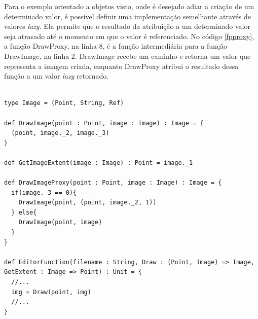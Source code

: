 Para o exemplo orientado a objetos visto, 
onde é desejado adiar a criação de um 
determinado valor, é possível definir 
uma implementação semelhante através 
de valores \textit{lazy}. Ela permite que 
o resultado da atribuição a um determinado 
valor seja atrasado até o momento em que 
o valor é referenciado\cite{functionalscala}. 
No código \ref{fpproxy}, a função DrawProxy, 
na linha 8, é a função intermediária para a 
função DrawImage, na linha 2. DrawImage recebe 
um caminho e retorna um valor que representa 
a imagem criada, enquanto DrawProxy atribui 
o resultado dessa função a um valor \textit{lazy} 
retornado.

\begin{lstlisting}[caption={Proxy Funcional},label=fpproxy]
    
type Image = (Point, String, Ref)

def DrawImage(point : Point, image : Image) : Image = {
  (point, image._2, image._3)
}

def GetImageExtent(image : Image) : Point = image._1

def DrawImageProxy(point : Point, image : Image) : Image = {
  if(image._3 == 0){
    DrawImage(point, (point, image._2, 1))
  } else{
    DrawImage(point, image)
  }
}

def EditorFunction(filename : String, Draw : (Point, Image) => Image, GetExtent : Image => Point) : Unit = {
  //...
  img = Draw(point, img)
  //...
}
    
\end{lstlisting}